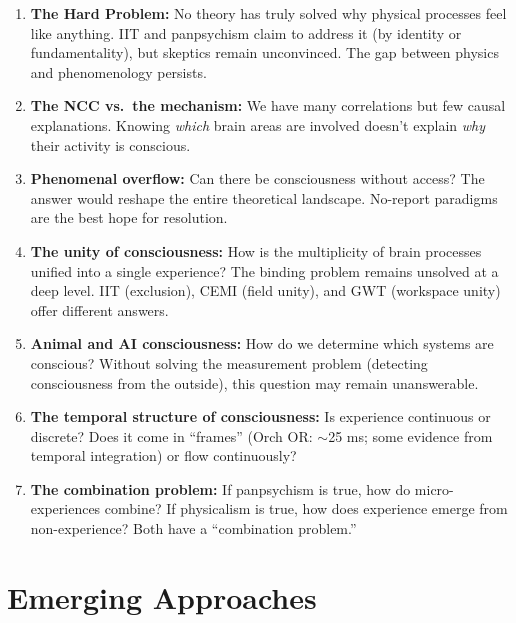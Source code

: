 \documentclass[11pt,a4paper]{report}
\begin{document}
\begin{futurebox}
\begin{enumerate}[leftmargin=1.5em]
  \item \textbf{The Hard Problem:} No theory has truly solved why physical processes feel like anything. IIT and panpsychism claim to address it (by identity or fundamentality), but skeptics remain unconvinced. The gap between physics and phenomenology persists.

  \item \textbf{The NCC vs.\ the mechanism:} We have many correlations but few causal explanations. Knowing \emph{which} brain areas are involved doesn't explain \emph{why} their activity is conscious.

  \item \textbf{Phenomenal overflow:} Can there be consciousness without access? The answer would reshape the entire theoretical landscape. No-report paradigms are the best hope for resolution.

  \item \textbf{The unity of consciousness:} How is the multiplicity of brain processes unified into a single experience? The binding problem remains unsolved at a deep level. IIT (exclusion), CEMI (field unity), and GWT (workspace unity) offer different answers.

  \item \textbf{Animal and AI consciousness:} How do we determine which systems are conscious? Without solving the measurement problem (detecting consciousness from the outside), this question may remain unanswerable.

  \item \textbf{The temporal structure of consciousness:} Is experience continuous or discrete? Does it come in ``frames'' (Orch OR: $\sim$25 ms; some evidence from temporal integration) or flow continuously?

  \item \textbf{The combination problem:} If panpsychism is true, how do micro-experiences combine? If physicalism is true, how does experience emerge from non-experience? Both have a ``combination problem.''
\end{enumerate}
\end{futurebox}

\section{Emerging Approaches}
\end{document}
